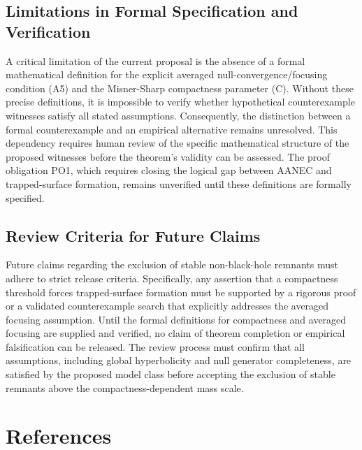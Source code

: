 \documentclass[conference]{IEEEtran}
\begin{document}
\subsection{Limitations in Formal Specification and Verification}
A critical limitation of the current proposal is the absence of a formal mathematical definition for the explicit averaged null-convergence/focusing condition (A5) and the Misner-Sharp compactness parameter (C). Without these precise definitions, it is impossible to verify whether hypothetical counterexample witnesses satisfy all stated assumptions. Consequently, the distinction between a formal counterexample and an empirical alternative remains unresolved. This dependency requires human review of the specific mathematical structure of the proposed witnesses before the theorem's validity can be assessed. The proof obligation PO1, which requires closing the logical gap between AANEC and trapped-surface formation, remains unverified until these definitions are formally specified.

\subsection{Review Criteria for Future Claims}
Future claims regarding the exclusion of stable non-black-hole remnants must adhere to strict release criteria. Specifically, any assertion that a compactness threshold forces trapped-surface formation must be supported by a rigorous proof or a validated counterexample search that explicitly addresses the averaged focusing assumption. Until the formal definitions for compactness and averaged focusing are supplied and verified, no claim of theorem completion or empirical falsification can be released. The review process must confirm that all assumptions, including global hyperbolicity and null generator completeness, are satisfied by the proposed model class before accepting the exclusion of stable remnants above the compactness-dependent mass scale.\section*{References}


\end{document}
